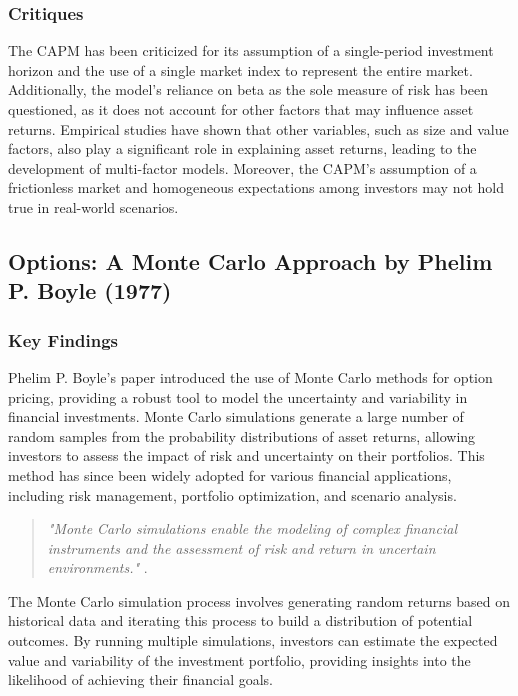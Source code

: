 \subsubsection{Critiques}
The CAPM has been criticized for its assumption of a single-period investment horizon and the use of a single market index to represent the entire market. Additionally, the model's reliance on beta as the sole measure of risk has been questioned, as it does not account for other factors that may influence asset returns. Empirical studies have shown that other variables, such as size and value factors, also play a significant role in explaining asset returns, leading to the development of multi-factor models. Moreover, the CAPM's assumption of a frictionless market and homogeneous expectations among investors may not hold true in real-world scenarios.

\subsection{Options: A Monte Carlo Approach by Phelim P. Boyle (1977)}

\subsubsection{Key Findings}
Phelim P. Boyle's paper introduced the use of Monte Carlo methods for option pricing, providing a robust tool to model the uncertainty and variability in financial investments. Monte Carlo simulations generate a large number of random samples from the probability distributions of asset returns, allowing investors to assess the impact of risk and uncertainty on their portfolios. This method has since been widely adopted for various financial applications, including risk management, portfolio optimization, and scenario analysis.

\begin{quote}
\textit{"Monte Carlo simulations enable the modeling of complex financial instruments and the assessment of risk and return in uncertain environments."} \citep{boyle1977options}.
\end{quote}

The Monte Carlo simulation process involves generating random returns based on historical data and iterating this process to build a distribution of potential outcomes. By running multiple simulations, investors can estimate the expected value and variability of the investment portfolio, providing insights into the likelihood of achieving their financial goals.

